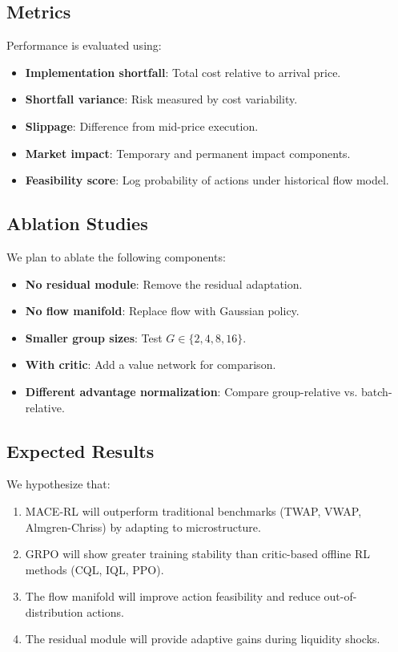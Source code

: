\documentclass{article}
\begin{document}
\subsection{Metrics}
Performance is evaluated using:

\begin{itemize}
    \item \textbf{Implementation shortfall}: Total cost relative to arrival price.
    \item \textbf{Shortfall variance}: Risk measured by cost variability.
    \item \textbf{Slippage}: Difference from mid-price execution.
    \item \textbf{Market impact}: Temporary and permanent impact components.
    \item \textbf{Feasibility score}: Log probability of actions under historical flow model.
\end{itemize}

\subsection{Ablation Studies}
We plan to ablate the following components:

\begin{itemize}
    \item \textbf{No residual module}: Remove the residual adaptation.
    \item \textbf{No flow manifold}: Replace flow with Gaussian policy.
    \item \textbf{Smaller group sizes}: Test $G \in \{2,4,8,16\}$.
    \item \textbf{With critic}: Add a value network for comparison.
    \item \textbf{Different advantage normalization}: Compare group-relative vs. batch-relative.
\end{itemize}

\subsection{Expected Results}
We hypothesize that:

\begin{enumerate}
    \item MACE-RL will outperform traditional benchmarks (TWAP, VWAP, Almgren-Chriss) by adapting to microstructure.
    \item GRPO will show greater training stability than critic-based offline RL methods (CQL, IQL, PPO).
    \item The flow manifold will improve action feasibility and reduce out-of-distribution actions.
    \item The residual module will provide adaptive gains during liquidity shocks.
\end{enumerate}
\end{document}
